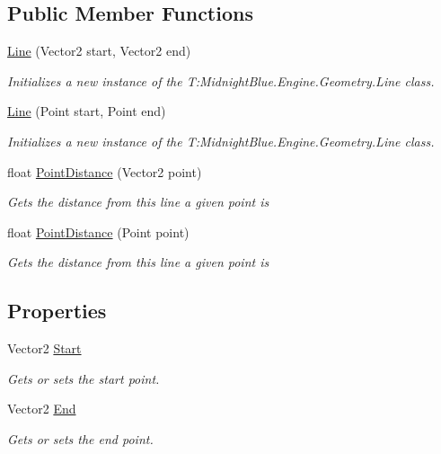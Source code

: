 \subsection*{Public Member Functions}
\begin{DoxyCompactItemize}
\item 
\hyperlink{class_midnight_blue_1_1_engine_1_1_geometry_1_1_line_ab403e1024d5f0f3f35f8f30982d42120}{Line} (Vector2 start, Vector2 end)
\begin{DoxyCompactList}\small\item\em Initializes a new instance of the T\+:\+Midnight\+Blue.\+Engine.\+Geometry.\+Line class. \end{DoxyCompactList}\item 
\hyperlink{class_midnight_blue_1_1_engine_1_1_geometry_1_1_line_a5a5555d66e78f3edbd676be9fb97cc63}{Line} (Point start, Point end)
\begin{DoxyCompactList}\small\item\em Initializes a new instance of the T\+:\+Midnight\+Blue.\+Engine.\+Geometry.\+Line class. \end{DoxyCompactList}\item 
float \hyperlink{class_midnight_blue_1_1_engine_1_1_geometry_1_1_line_a635a797ebd3d805977df591277a444f3}{Point\+Distance} (Vector2 point)
\begin{DoxyCompactList}\small\item\em Gets the distance from this line a given point is \end{DoxyCompactList}\item 
float \hyperlink{class_midnight_blue_1_1_engine_1_1_geometry_1_1_line_a6db10326db04557bde223029167254a8}{Point\+Distance} (Point point)
\begin{DoxyCompactList}\small\item\em Gets the distance from this line a given point is \end{DoxyCompactList}\end{DoxyCompactItemize}
\subsection*{Properties}
\begin{DoxyCompactItemize}
\item 
Vector2 \hyperlink{class_midnight_blue_1_1_engine_1_1_geometry_1_1_line_ad4ca913b1c73c20d7af64652bd3ae7fa}{Start}
\begin{DoxyCompactList}\small\item\em Gets or sets the start point. \end{DoxyCompactList}\item 
Vector2 \hyperlink{class_midnight_blue_1_1_engine_1_1_geometry_1_1_line_ad825e12a4c0889bd9a6999b473b3e317}{End}
\begin{DoxyCompactList}\small\item\em Gets or sets the end point. \end{DoxyCompactList}\end{DoxyCompactItemize}


